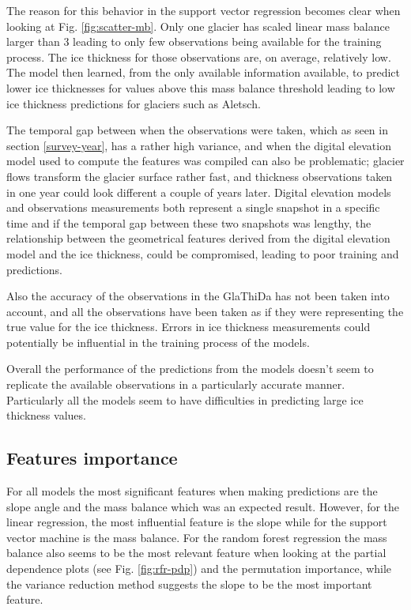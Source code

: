 The reason for this behavior in the support vector regression becomes clear when looking at Fig. \ref{fig:scatter-mb}. Only one glacier has scaled linear mass balance larger than 3 leading to only few observations being available for the training process. The ice thickness for those observations are, on average, relatively low. The model then learned, from the only available information available, to predict lower ice thicknesses for values above this mass balance threshold leading to low ice thickness predictions for glaciers such as Aletsch.

The temporal gap between when the observations were taken, which as seen in section \ref{survey-year}, has a rather high variance, and when the digital elevation model used to compute the features was compiled can also be problematic; glacier flows transform the glacier surface rather fast, and thickness observations taken in one year could look different a couple of years later. Digital elevation models and observations measurements both represent a single snapshot in a specific time and if the temporal gap between these two snapshots was lengthy, the relationship between the geometrical features derived from the digital elevation model and the ice thickness, could be compromised, leading to poor training and predictions.

Also the accuracy of the observations in the GlaThiDa has not been taken into account, and all the observations have been taken as if they were representing the true value for the ice thickness. Errors in ice thickness measurements could potentially be influential in the training process of the models.

Overall the performance of the predictions from the models doesn't seem to replicate the available observations in a particularly accurate manner. Particularly all the models seem to have difficulties in predicting large ice thickness values.

\subsection{Features importance}\label{disc-features}
For all models the most significant features when making predictions are the slope angle and the mass balance which was an expected result. However, for the linear regression, the most influential feature is the slope while for the support  vector machine is the mass balance. For the random forest regression the mass balance also seems to be the most relevant feature when looking at the partial dependence plots (see Fig. \ref{fig:rfr-pdp}) and the permutation importance, while the variance reduction method suggests the slope to be the most important feature.

